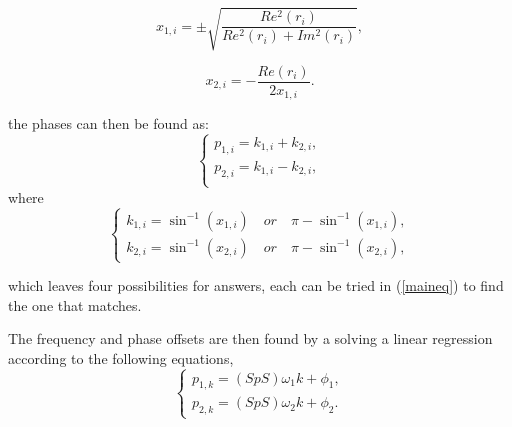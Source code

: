 \begin{equation}
    x_{1,i}= \pm \sqrt{\frac{Re^2(r_i)}{Re^2(r_i) + Im^2(r_i)}},
\end{equation}

\begin{equation}
    x_{2,i}= - \frac{Re(r_i)}{2x_{1,i}}.
\end{equation}

the phases can then be found as:
\begin{equation}
    \begin{cases}
        p_{1,i}=k_{1,i} + k_{2,i},\\
        p_{2,i}=k_{1,i} - k_{2,i},\\
    \end{cases}
\end{equation}
where
\begin{equation}
    \begin{cases}
        k_{1,i}= \sin^{-1}(x_{1,i}) \quad or \quad \pi - \sin^{-1}(x_{1,i}), \\
        k_{2,i}= \sin^{-1}(x_{2,i}) \quad or \quad \pi - \sin^{-1}(x_{2,i}),
    \end{cases}
\end{equation}

which leaves four possibilities for answers, each can be tried in (\ref{maineq}) to find the one that matches. 

\fi

The frequency and phase offsets are then found by a solving a linear regression according to the following equations,
\begin{equation}
    \begin{cases}
        p_{1,k}=(SpS) \omega_1 k + \phi_1, \\
        p_{2,k}=(SpS) \omega_2 k + \phi_2.
    \end{cases}
\end{equation}

%
%
%

